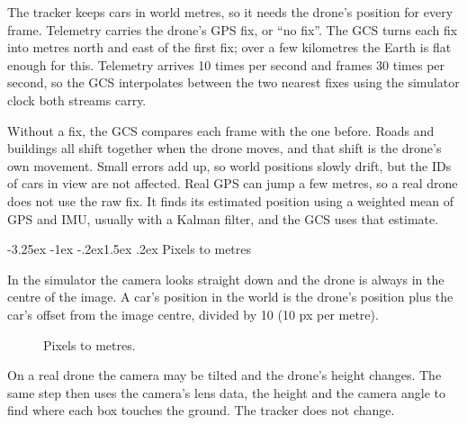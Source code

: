 \documentclass[11pt]{article}
\makeatletter
\renewcommand\subsection{\@startsection{subsection}{2}{\z@}%
  {-3.25ex \@plus -1ex \@minus -.2ex}{1.5ex \@plus .2ex}%
  {\normalfont\large\bfseries\color{accent}}}
\makeatother
\begin{document}
The tracker keeps cars in world metres, so it needs the drone's position for
every frame. Telemetry carries the drone's GPS fix, or ``no fix''. The GCS
turns each fix into metres north and east of the first fix; over a few
kilometres the Earth is flat enough for this. Telemetry arrives 10 times per
second and frames 30 times per second, so the GCS interpolates between the
two nearest fixes using the simulator clock both streams carry.

Without a fix, the GCS compares each frame with the one before. Roads and
buildings all shift together when the drone moves, and that shift is the
drone's own movement. Small errors add up, so world positions slowly drift,
but the IDs of cars in view are not affected. Real GPS can jump a few
metres, so a real drone does not use the raw fix. It finds its estimated
position using a weighted mean of GPS and IMU, usually with a Kalman filter,
and the GCS uses that estimate.

\subsection{Pixels to metres}

In the simulator the camera looks straight down and the drone is always in
the centre of the image. A car's position in the world is the drone's
position plus the car's offset from the image centre, divided by 10 (10 px
per metre).

\begin{figure}[htbp]
\centering
{}
\caption{Pixels to metres.}
\end{figure}

On a real drone the camera may be tilted and the drone's height changes. The
same step then uses the camera's lens data, the height and the camera angle to
find where each box touches the ground. The tracker does not change.
\end{document}
